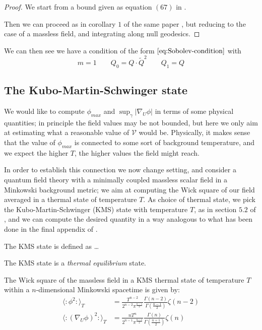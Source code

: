 \begin{proof}
    We start from a bound given as equation \((67)\) in \cite{brown2018singularity}.

    Then we can proceed as in corollary \(1\) of the same paper \cite{brown2018singularity}, but reducing to the case of a massless field, and integrating along null geodesics.
\end{proof}

We can then see we have a condition of the form \(\eqref{eq:Sobolev-condition}\) with 
\[
m = 1 \quad\quad Q_0 = Q\cdot\tilde{Q}^2 \quad\quad Q_1 = Q 
\]

\subsection{The Kubo-Martin-Schwinger state}

We would like to compute \(\phi_{max}\) and \(\sup_{\gamma}\vert \nabla_U\phi\vert\) in terms of some physical quantities; in principle the field values may be not bounded, but here we only aim at estimating what a reasonable value of \(\mathcal{V}\) would be.
Physically, it makes sense that the value of \(\phi_{max}\) is connected to some sort of background temperature, and we expect the higher \(T\), the higher values the field might reach.

In order to establish this connection we now change setting, and consider a quantum field theory with a minimally coupled massless scalar field in a Minkowski background metric; we aim at computing the Wick square of our field averaged in a thermal state of temperature \(T\). As choice of thermal state, we pick the Kubo-Martin-Schwinger (KMS) state with temperature \(T\), as in section \(5.2\) of \cite{fewster2020new}, and we can compute the desired quantity in a way analogous to what has been done in the final appendix of \cite{brown2018singularity}.

\begin{definition}
    The KMS state is defined as \dots
\end{definition}

\begin{remark}
	The KMS state is a \emph{thermal equilibrium} state.
\end{remark}

\begin{prop}
    The Wick square of the massless field in a KMS thermal state of temperature \(T\) within a \(n\)-dimensional Minkowski spacetime is given by:
    \begin{align}
         \langle \colon \phi^2 \colon\rangle_T &= \frac{T^{n - 2}}{2^{n - 2}\pi^{\frac{n - 1}{2}}}\frac{\Gamma(n - 2)}{\Gamma\left(\frac{n - 1}{2}\right)}\zeta(n - 2) \\
        \langle \colon (\nabla_U\phi)^2 \colon\rangle_T &= \frac{nT^n}{2^{n - 1}\pi^{\frac{n - 1}{2}}} \frac{\Gamma(n)}{\Gamma\left(\frac{n + 1}{2}\right)} \zeta(n)
    \end{align}

\end{prop}
    
